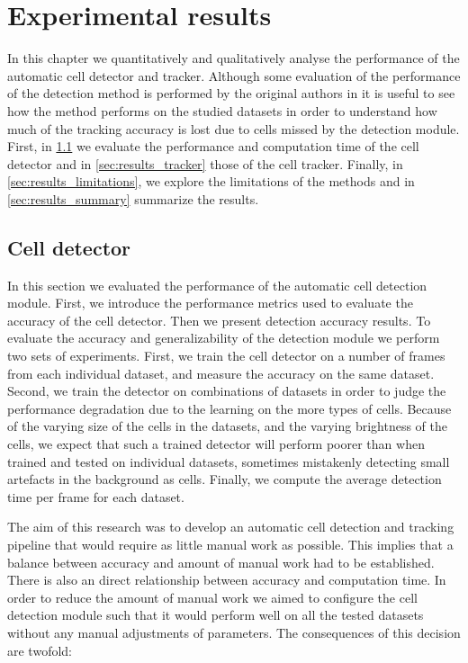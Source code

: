 \chapter{Experimental results }
\label{chap:results}

In this chapter we quantitatively and qualitatively analyse the performance of the automatic cell detector and tracker. Although some evaluation of the performance of the detection method is performed by the original authors in \cite{arteta12} it is useful to see how the method performs on the studied datasets in order to understand how much of the tracking accuracy is lost due to cells missed by the detection module. First, in \cref{sec:results_detector} we evaluate the performance and computation time of the cell detector and in \cref{sec:results_tracker} those of the cell tracker. Finally, in \cref{sec:results_limitations}, we explore the limitations of the methods and in \cref{sec:results_summary} summarize the results.


\section{Cell detector }
	\label{sec:results_detector}
	
	In this section we evaluated the performance of the automatic cell detection module. First, we introduce the performance metrics used to evaluate the accuracy of the cell detector. Then we present detection accuracy results. To evaluate the accuracy and generalizability of the detection module we perform two sets of experiments. First, we train the cell detector on a number of frames from each individual dataset, and measure the accuracy on the same dataset. Second, we train the detector on combinations of datasets in order to judge the performance degradation due to the learning on the more types of cells. Because of the varying size of the cells in the datasets, and the varying brightness of the cells, we expect that such a trained detector will perform poorer than when trained and tested on individual datasets, sometimes mistakenly detecting small artefacts in the background as cells. Finally, we compute the average detection time per frame for each dataset.
	
	The aim of this research was to develop an automatic cell detection and tracking pipeline that would require as little manual work as possible. This implies that a balance between accuracy and amount of manual work had to be established. There is also an direct relationship between accuracy and computation time. In order to reduce the amount of manual work we aimed to configure the cell detection module such that it would perform well on all the tested datasets without any manual adjustments of parameters. The consequences of this decision are twofold:
	
